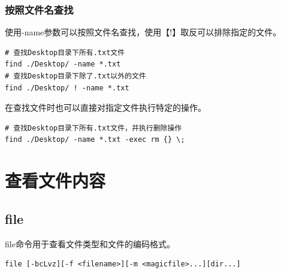 \documentclass[12pt, openany, oneside]{book}
\begin{document}
\subsubsection{按照文件名查找}

使用-name参数可以按照文件名查找，使用【!】取反可以排除指定的文件。

\vspace{-0.5cm}

\begin{lstlisting}
# 查找Desktop目录下所有.txt文件
find ./Desktop/ -name *.txt
# 查找Desktop目录下除了.txt以外的文件
find ./Desktop/ ! -name *.txt
\end{lstlisting}

在查找文件时也可以直接对指定文件执行特定的操作。

\vspace{-0.5cm}

\begin{lstlisting}
# 查找Desktop目录下所有.txt文件，并执行删除操作
find ./Desktop/ -name *.txt -exec rm {} \;
\end{lstlisting}

\newpage

\section{查看文件内容}

\subsection{file}

file命令用于查看文件类型和文件的编码格式。

\vspace{-0.5cm}

\begin{lstlisting}
file [-bcLvz][-f <filename>][-m <magicfile>...][dir...]
\end{lstlisting}
\end{document}
